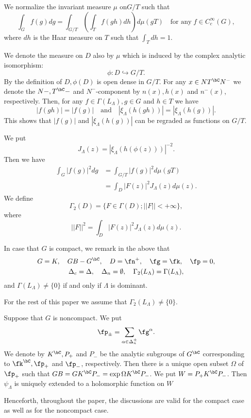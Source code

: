 We normalize the invariant measure $\mu$ on$G/T$ such that
$$
\int_{G}f(g)dg =\int_{G/T}\left(\int_{T}f(gh)dh\right)d\mu(gT) \quad \text{for any}\; f \in C_{c}^{\infty}(G),
$$
where $dh$ is the Haar measure on $T$ such that $\int_{T}dh =1$.

We denote the measure on $D$ also by $\mu$ which is induced by the complex analytic isomorphism:
$$
\phi : D\hookrightarrow G/T.
$$
By the definition of $D, \phi(D)$ is open dense in $G/T$. For any $x \in NT^{\bC}N^{-}$ we denote the $N-, T^{\bC}-$ and $N^{-}$-component by $n(x),h(x)$ and $n^{-}(x)$, respectively. Then, for any $f \in \Gamma(L_{\Lambda}), g \in G$ and $h \in T$ we have
$$
|f(gh)|= |f(g)| \quad \text{and} \quad |\xi_{\Lambda}(h(gh))|= |\xi_{\Lambda}(h(g))|.
$$ 
This shows that $|f(g)|$ and $|\xi_{\Lambda}(h(g))|$ can be regraded as functions on $G/T$.

We put
$$
J_{\Lambda}(z) = |\xi_{\Lambda}(h(\phi(z)))|^{-2}.
$$
Then we have
\begin{align*}
\int_{G}|f(g)|^{2}dg &= \int_{G/T}|f(g)|^{2}d\mu(gT)\\
& = \int_{D}|F(z)|^{2}J_{\Lambda}(z)d\mu (z).
\end{align*}
We define
$$
\Gamma_{2}(D)= \{ F \in \Gamma (D); ||F||< +\infty\},
$$
where
$$
||F||^{2} = \int_{D}|F(z)|^{2}J_{\Lambda}(z)d\mu(z).
$$

In case that  $G$ is compact, we remark in the above that
\begin{gather*}
G=K,\quad GB-G^{\bC},\quad D =\fn^{+},\quad \fg = \fk,\quad \fp=0,\\
\Delta_{c}= \Delta,\quad \Delta_{n}= \emptyset,\quad \Gamma_{2}(L_{\Lambda})=\Gamma(L_{\Lambda}),
\end{gather*}
and $\Gamma(L_{\Lambda})\neq \{0\}$ if and only if $\Lambda$ is dominant.

For the rest of this paper we assume that $\Gamma_{2}(L_{\Lambda})\neq \{0\}$.

Suppose that $G$ is noncompact. We put
$$
\fp_{\pm}= \sum\limits_{\alpha \in \Delta_{n}^{\pm}}\fg^{\alpha}.
$$
We denote by $K^{\bC}, P_{+}$ and $P_{-}$ be the analytic subgroups of $G^{\bC}$ corresponding to $\fk^{\bC}, \fp_{+}$ and $\fp_{-}$, respectively. Then there is a unique open subset $\Omega$ of $\fp_{+}$ such that $GB=GK^{\bC}P_{-}=\exp\Omega K^{\bC}P_{-}$. We put $W=P_{+}K^{\bC}P_{-}$. Then $\psi_{\Lambda}$ is uniquely extended to a holomorphic function on $W$

Henceforth, throughout the paper, the discussions are valid for the compact case as well as for the noncompact case.

